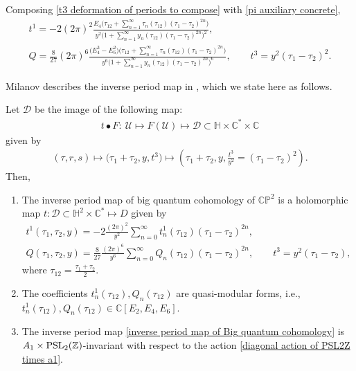  Composing \eqref{t3 deformation of periods to compose} with \eqref{pi auxiliary concrete},
\begin{gather*}
t^1=-2 (2\pi )^2\frac{E_4\bigl(\tau_{12}+\sum_{n=1}^{\infty} \tau_{n}(\tau_{12}) (\tau_1-\tau_2)^{2n} \bigr)}{y^2\bigl( 1+\sum_{n=1}^{\infty} y_n(\tau_{12})(\tau_1-\tau_2)^{2n} \bigr)^2},\\
Q=\frac{8}{27}(2\pi)^6 \frac{\bigl(E_4^3-E_6^2\bigr)\bigl(\tau_{12}+\sum_{n=1}^{\infty} \tau_{n}(\tau_{12}) (\tau_1-\tau_2)^{2n} \bigr)}{y^6\bigl( 1+\sum_{n=1}^{\infty} y_n(\tau_{12})(\tau_1-\tau_2)^{2n} \bigr)^6},\qquad
t^3=y^2(\tau_1-\tau_2)^2.
\end{gather*}

 Milanov describes the inverse period map in \cite[Theorem 2.4]{Milanov}, which we state here as follows.

\begin{Theorem}
Let $\mathcal{D}$ be the image of the following map:
\begin{gather*}
 t\bullet F\colon\ \mathcal{U}\mapsto F(\mathcal{U})\mapsto \mathcal{D}\subset \mathbb{H}\times\mathbb{C}^{*}\times\mathbb{C}
\end{gather*}
given by
\begin{gather*}
(\tau,r,s)\mapsto \bigl(\tau_1+\tau_2,y,t^3\bigr)\mapsto \left(\tau_1+\tau_2,y,\frac{t^3}{y^2}=(\tau_1-\tau_2)^2\right).
\end{gather*}
Then,
\begin{enumerate}\itemsep=0pt
\item[$(1)$]
The inverse period map of big quantum cohomology of $\mathbb{CP}^2$ is a holomorphic map $t\colon \mathcal{D}\subset \mathbb{H}^2\times \mathbb{C}^{*} \mapsto D$
given by
\begin{gather}
t^1(\tau_1,\tau_2,y)=-2\frac{ (2\pi )^2}{y^2}\sum_{n=0}^{\infty} t^1_n(\tau_{12})(\tau_1-\tau_2)^{2n} ,\nonumber\\
Q(\tau_1,\tau_2,y)=\frac{8}{27}\frac{(2\pi)^6 }{y^6}\sum_{n=0}^{\infty} Q_n(\tau_{12})(\tau_1-\tau_2)^{2n},\qquad
t^3=y^2(\tau_1-\tau_2),\label{inverse period map of Big quantum cohomology}
\end{gather}
where $\tau_{12}=\frac{\tau_1+\tau_2}{2}$.
\item[$(2)$]
The coefficients $t^1_n(\tau_{12}), Q_n(\tau_{12})$ are quasi-modular forms, i.e.,
$
t^1_n(\tau_{12}), Q_n(\tau_{12})\in \mathbb{C}[E_2,\allowbreak E_4,E_6]$.
\item[$(3)$] The inverse period map \eqref{inverse period map of Big quantum cohomology} is $A_1\times {\rm PSL}_2(\mathbb{Z})$-invariant with respect to the action \eqref{diagonal action of PSL2Z times a1}.

\end{enumerate}

\end{Theorem}

